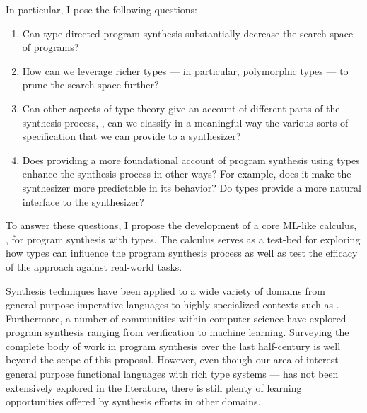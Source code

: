In particular, I pose the following questions:
\begin{enumerate}
\item Can type-directed program synthesis substantially decrease the search
space of programs?
\item How can we leverage richer types --- in particular, polymorphic types ---
to prune the search space further?
\item Can other aspects of type theory give an account of different parts of the
synthesis process, \eg, can we classify in a meaningful way the various sorts of
specification that we can provide to a synthesizer?
\item Does providing a more foundational account of program synthesis using
types enhance the synthesis process in other ways?  For example, does it make
the synthesizer more predictable in its behavior?  Do types provide a more
natural interface to the synthesizer?
\end{enumerate}

To answer these questions, I propose the development of a core ML-like calculus,
\lsyn, for program synthesis with types.  The calculus serves as a test-bed for
exploring how types can influence the program synthesis process as well as test
the efficacy of the approach against real-world tasks.

Synthesis techniques have been applied to a wide variety of domains from
general-purpose imperative languages to highly specialized contexts such as
\cite{gupta-popl-2011, ghica-popl-2011, fisher-popl-2008}.  Furthermore, a
number of communities within computer science have explored program synthesis
ranging from verification to machine learning.  Surveying the complete body of
work in program synthesis over the last half-century is well beyond the scope of
this proposal.  However, even though our area of interest --- general purpose
functional languages with rich type systems --- has not been extensively
explored in the literature, there is still plenty of learning opportunities
offered by synthesis efforts in other domains.


